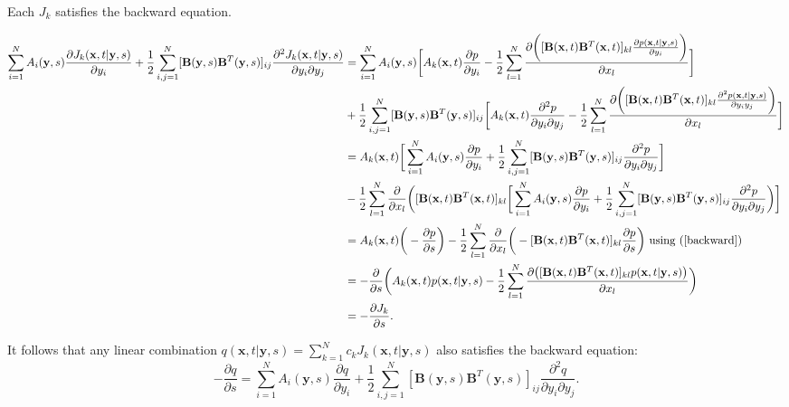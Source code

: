\documentclass{article}
\newcommand{\mb}{\mathbf}
\begin{document}
\begin{claim}
Each $J_k$  satisfies the backward equation.
\end{claim}
\begin{pf}
{\tiny
\begin{align*}
\sum_{i=1}^NA_i({\mb y},s)\frac{\partial J_k({\mb x},t|{\mb y},s)}{\partial y_i}+\frac{1}{2}\sum_{i,j=1}^N[{\mb B}({\mb y},s){\mb B}^T({\mb y},s)]_{ij}\frac{\partial^2 J_k({\mb x},t|{\mb y},s)}{\partial y_i\partial y_j}
&=\sum_{i=1}^NA_i({\mb y},s)\bigg[A_k({\mb x},t)\frac{\partial p}{\partial y_i}-\frac{1}{2}\sum_{l=1}^N\frac{\partial \bigg([{\mb B}({\mb x},t){\mb B}^T({\mb x},t)]_{kl}\frac{\partial p({\mb x},t|{\mb y},s)}{\partial y_i}\bigg)}{\partial x_l}\bigg]
\\&+\frac{1}{2}\sum_{i,j=1}^N[{\mb B}({\mb y},s){\mb B}^T({\mb y},s)]_{ij}\bigg[A_k({\mb x},t)\frac{\partial^2 p}{\partial y_i\partial y_j}-\frac{1}{2}\sum_{l=1}^N\frac{\partial \bigg([{\mb B}({\mb x},t){\mb B}^T({\mb x},t)]_{kl}\frac{\partial^2 p({\mb x},t|{\mb y},s)}{\partial y_iy_j}\bigg)}{\partial x_l}\bigg]
\\&=A_k({\mb x},t)\bigg[\sum_{i=1}^NA_i({\mb y},s)\frac{\partial p}{\partial y_i}+\frac{1}{2}\sum_{i,j=1}^N[{\mb B}({\mb y},s){\mb B}^T({\mb y},s)]_{ij}\frac{\partial^2 p}{\partial y_i\partial y_j}\bigg]
\\&-\frac{1}{2}\sum_{l=1}^N\frac{\partial }{\partial x_l}\bigg([{\mb B}({\mb x},t){\mb B}^T({\mb x},t)]_{kl}\bigg[\sum_{i=1}^NA_i({\mb y},s)\frac{\partial p}{\partial y_i}+\frac{1}{2}\sum_{i,j=1}^N[{\mb B}({\mb y},s){\mb B}^T({\mb y},s)]_{ij}\frac{\partial^2 p}{\partial y_i\partial y_j}\bigg)\bigg]
\\&=A_k({\mb x},t)\bigg(-\frac{\partial p}{\partial s}\bigg)-\frac{1}{2}\sum_{l=1}^N\frac{\partial }{\partial x_l}\bigg(-[{\mb B}({\mb x},t){\mb B}^T({\mb x},t)]_{kl}\frac{\partial p}{\partial s}\bigg) \text{ using (\ref{backward})}
\\&=-\frac{\partial }{\partial s}\bigg(A_k({\mb x},t)p({\mb x},t|{\mb y},s)-\frac{1}{2}\sum_{l=1}^N\frac{\partial \big([{\mb B}({\mb x},t){\mb B}^T({\mb x},t)]_{kl}p({\mb x},t|{\mb y},s)\big)}{\partial x_l}\bigg)
\\&=-\frac{\partial J_k}{\partial s}.
\end{align*}
}
\end{pf}


It follows that any linear combination $q({\mb x},t|{\mb y},s)=\sum_{k=1}^Nc_kJ_k({\mb x},t|{\mb y},s)$ also satisfies the backward equation:
\begin{equation}
-\frac{\partial q}{\partial s}=\sum_{i=1}^NA_i({\mb y},s)\frac{\partial q}{\partial y_i}+\frac{1}{2}\sum_{i,j=1}^N[{\mb B}({\mb y},s){\mb B}^T({\mb y},s)]_{ij}\frac{\partial ^2 q}{\partial y_i\partial y_j}. \label{jbackeq}
\end{equation}
\end{document}
